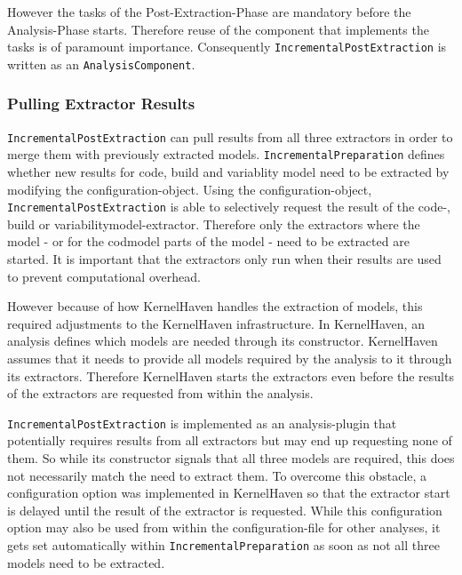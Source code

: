 \documentclass[a4paper]{article}
\begin{document}
However the tasks of the Post-Extraction-Phase are mandatory before the Analysis-Phase starts. Therefore reuse of the component that implements the tasks is of paramount importance. Consequently \texttt{Incremental\-Post\-Extraction} is written as an \texttt{Analysis\-Component}.

\subsubsection{Pulling Extractor Results}

\texttt{Incremental\-Post\-Extraction} can pull results from all three extractors in order to merge them with previously extracted models. \texttt{Incremental\-Preparation} defines whether new results for code, build and variablity model need to be extracted by modifying the configuration-object. Using the configuration-object, \texttt{Incremental\-Post\-Extraction} is able to selectively request the result of the code-, build or variabilitymodel-extractor. Therefore only the extractors where the model - or for the codmodel parts of the model - need to be extracted are started. It is important that the extractors only run when their results are used to prevent computational overhead.

However because of how KernelHaven handles the extraction of models, this required adjustments to the KernelHaven infrastructure. In KernelHaven, an analysis defines which models are needed through its constructor. KernelHaven assumes that it needs to provide all models required by the analysis to it through its extractors. Therefore KernelHaven starts the extractors even before the results of the extractors are requested from within the analysis. 

\texttt{Incremental\-Post\-Extraction} is implemented as an analysis-plugin that potentially requires results from all extractors but may end up requesting none of them. So while its constructor signals that all three models are required, this does not necessarily match the need to extract them. To overcome this obstacle, a configuration option was implemented in KernelHaven so that the extractor start is delayed until the result of the extractor is requested. While this configuration option may also be used from within the configuration-file for other analyses, it gets set automatically within \texttt{Incremental\-Preparation} as soon as not all three models need to be extracted.
\end{document}
